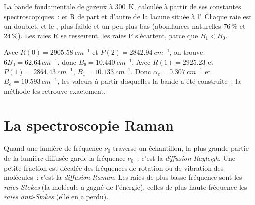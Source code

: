 \begin{omfigure}

{\small La bande fondamentale de  gazeux à \qty{300}{K},
calculée à partir de ses constantes spectroscopiques~:  et R
de part et d'autre de la lacune située à l'. Chaque
raie est un doublet,  et le , plus faible et
un peu plus bas (abondances naturelles 76\,\% et 24\,\%). Les raies R se
resserrent,
les raies P s'écartent, parce que $B_1 < B_0$.}
\end{omfigure}

\begin{example}\label{ex:b3:rovibrational-spectroscopy:analysis}
Avec $R(0) = \qty{2905.58}{cm^{-1}}$ et $P(2) = \qty{2842.94}{cm^{-1}}$, on trouve
$6B_0 = \qty{62.64}{cm^{-1}}$, donc $B_0 = \qty{10.440}{cm^{-1}}$. Avec $R(1) = 2925.23$ et $P(1) =
\qty{2864.43}{cm^{-1}}$, $B_1 = \qty{10.133}{cm^{-1}}$. Donc $\alpha_e = \qty{0.307}{cm^{-1}}$
et $B_e = \qty{10.593}{cm^{-1}}$, les valeurs à partir desquelles la
bande a été construite~: la méthode les retrouve exactement.
\end{example}

\section{La spectroscopie Raman}

\begin{definition}\label{def:b3:rovibrational-spectroscopy:raman}
Quand une lumière de fréquence $\nu_0$ traverse un échantillon, la plus
grande partie de la lumière diffusée garde la fréquence $\nu_0$~: c'est
la \emph{diffusion Rayleigh}.
Une petite fraction est décalée des fréquences de rotation ou de
vibration des molécules~: c'est la \emph{diffusion Raman}.
Les raies de plus basse fréquence sont les \emph{raies Stokes} (la
molécule a gagné de l'énergie), celles de plus haute fréquence les
\emph{raies anti-Stokes} (elle en a perdu).
\end{definition}

